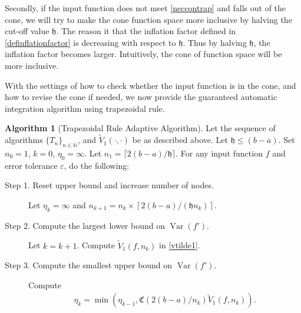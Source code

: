 \documentclass[draft]{iitthesis}
\DeclareMathOperator{\Var}{Var}
\theoremstyle{definition}
\newtheorem{algo}{Algorithm}
\theoremstyle{remark}
\begin{document}
Secondly, if the input function does not meet \eqref{neccontrap} and falls out of the cone, we will try to make the cone function space more inclusive by halving the cut-off value $\mathfrak{h}$. The reason it that the inflation factor defined in \eqref{definflationfactor} is decreasing with respect to $\mathfrak{h}$. Thus by halving $\mathfrak{h}$, the inflation factor becomes larger. Intuitively, the cone of function space will be more inclusive.

With the settings of how to check whether the input function is in the cone, and how to revise the cone if needed, we now provide the guaranteed automatic integration algorithm using trapezoidal rule.
\begin{algo}[Trapezoidal Rule Adaptive Algorithm] \label{multistagetrapalgo}
Let the sequence of algorithms $\{T_n\}_{n\in \mathbb{N}}$, %
and $\widetilde{V}_1(\cdot,\cdot)$ be as described above.
Let $\mathfrak{h}\le (b-a)$. Set $n_{0}=1$, $k=0$, $\eta_{0}=\infty$. Let $n_1=\lceil2(b-a)/\mathfrak{h}\rceil$. For any input function $f$ and error tolerance $\varepsilon$, do the following: %
\begin{description}
\item[Step 1. Reset upper bound and increase number of nodes.] Let $\eta_{k}=\infty$ and $n_{k+1}=n_k\times\left\lceil2(b-a)/(\mathfrak{h}n_{k})\right\rceil$.

\item[Step 2. Compute the largest lower bound on {$\Var(f')$}.] Let $k=k+1$. Compute  $\widetilde{V}_1(f,n_k)$ in \eqref{vtilde1}.%

\item[Step 3. Compute the smallest upper bound on {$\Var(f')$}.] Compute
    \begin{align*}
        \eta_{k}=\min\left(\eta_{k-1},\mathfrak{C}(2(b-a)/n_{k})\widetilde{V}_1(f,n_k)\right).
    \end{align*}


\end{description}
\end{algo}
\end{document}
